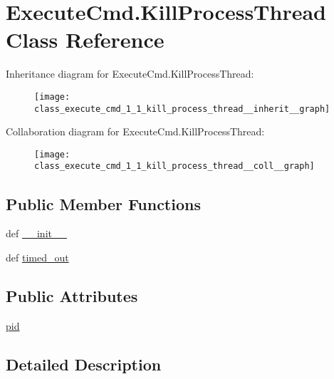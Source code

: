\hypertarget{class_execute_cmd_1_1_kill_process_thread}{\section{Execute\-Cmd.\-Kill\-Process\-Thread Class Reference}
\label{class_execute_cmd_1_1_kill_process_thread}
}


Inheritance diagram for Execute\-Cmd.\-Kill\-Process\-Thread\-:
\nopagebreak
\begin{figure}[H]
\begin{center}
\leavevmode
\texttt{[image: class\_execute\_cmd\_1\_1\_kill\_process\_thread\_\_inherit\_\_graph]}
\end{center}
\end{figure}


Collaboration diagram for Execute\-Cmd.\-Kill\-Process\-Thread\-:
\nopagebreak
\begin{figure}[H]
\begin{center}
\leavevmode
\texttt{[image: class\_execute\_cmd\_1\_1\_kill\_process\_thread\_\_coll\_\_graph]}
\end{center}
\end{figure}
\subsection*{Public Member Functions}
\begin{DoxyCompactItemize}
\item 
def \hyperlink{class_execute_cmd_1_1_kill_process_thread_a414bcd0a32109602bf07fb94ed69bef3}{\-\_\-\-\_\-init\-\_\-\-\_\-}
\item 
def \hyperlink{class_execute_cmd_1_1_kill_process_thread_a19365e409f39f61d0eb67d0769bd829c}{timed\-\_\-out}
\end{DoxyCompactItemize}
\subsection*{Public Attributes}
\begin{DoxyCompactItemize}
\item 
\hyperlink{class_execute_cmd_1_1_kill_process_thread_a66ec3fdeb7fad04cd760e3ede0903e65}{pid}
\end{DoxyCompactItemize}


\subsection{Detailed Description}


